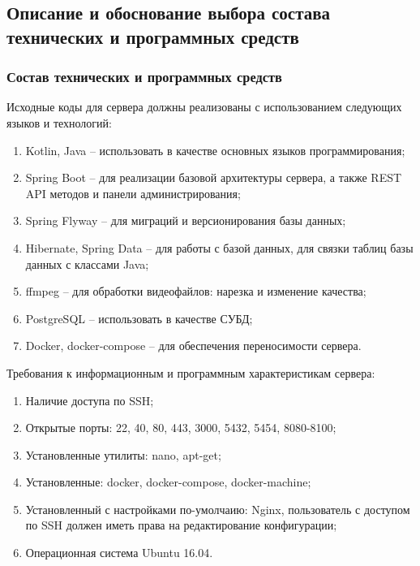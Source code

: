 \documentclass{../includes/TechDoc}
\begin{document}
    \clearpage

    \subsection{Описание и обоснование выбора состава технических и программных средств}

    \subsubsection{Состав технических и программных средств}

    Исходные коды для сервера должны реализованы с использованием следующих языков и технологий:
    \begin{enumerate}[noitemsep]
        \item Kotlin, Java -- использовать в качестве основных языков программирования;
        \item Spring Boot -- для реализации базовой архитектуры сервера, а также REST API методов и панели администрирования;
        \item Spring Flyway -- для миграций и версионирования базы данных;
        \item Hibernate, Spring Data -- для работы с базой данных, для связки таблиц базы данных с классами Java;
        \item ffmpeg -- для обработки видеофайлов: нарезка и изменение качества;
        \item PostgreSQL -- использовать в качестве СУБД;
        \item Docker, docker-compose -- для обеспечения переносимости сервера.
    \end{enumerate}

    Требования к информационным и программным характеристикам сервера:
    \begin{enumerate}[noitemsep]
        \item Наличие доступа по SSH;
        \item Открытые порты: 22, 40, 80, 443, 3000, 5432, 5454, 8080-8100;
        \item Установленные утилиты: nano, apt-get;
        \item Установленные: docker, docker-compose, docker-machine;
        \item Установленный с настройками по-умолчаию: Nginx, пользователь с доступом по SSH должен иметь права
        на редактирование конфигурации;
        \item Операционная система Ubuntu 16.04.
    \end{enumerate}
\end{document}
